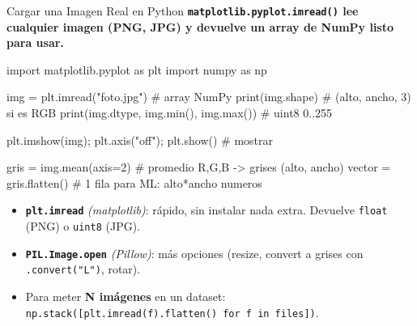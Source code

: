 \documentclass[aspectratio=169, 11pt]{beamer}
\begin{document}
\begin{frame}[fragile,shrink=12]{Cargar una Imagen Real en Python}
  \vspace{-4pt}
  {\footnotesize\color{arcaDark}\bfseries
    \texttt{matplotlib.pyplot.imread()} lee cualquier imagen
    (PNG, JPG) y devuelve un array de NumPy listo para usar.}

  \vspace{4pt}
  \begin{pyblock}
import matplotlib.pyplot as plt
import numpy as np

img = plt.imread("foto.jpg")     # array NumPy
print(img.shape)                  # (alto, ancho, 3) si es RGB
print(img.dtype, img.min(), img.max())   # uint8 0..255

plt.imshow(img); plt.axis("off"); plt.show()  # mostrar

gris = img.mean(axis=2)           # promedio R,G,B -> grises (alto, ancho)
vector = gris.flatten()           # 1 fila para ML: alto*ancho numeros
  \end{pyblock}

  \vspace{4pt}
  {\scriptsize\color{arcaDark}
  \begin{itemize}\setlength{\itemsep}{2pt}
    \item[{\color{arcaRed}\scriptsize\faArrowRight}]
      \textbf{\texttt{plt.imread}} \emph{(matplotlib)}: r\'apido, sin
      instalar nada extra. Devuelve \texttt{float} (PNG) o \texttt{uint8} (JPG).
    \item[{\color{arcaRed}\scriptsize\faArrowRight}]
      \textbf{\texttt{PIL.Image.open}} \emph{(Pillow)}: m\'as opciones
      (resize, convert a grises con \texttt{.convert("L")}, rotar).
    \item[{\color{codeGreen}\scriptsize\faArrowRight}]
      Para meter \textbf{N im\'agenes} en un dataset:
      \texttt{np.stack([plt.imread(f).flatten() for f in files])}.
  \end{itemize}
  }
\end{frame}
\end{document}
